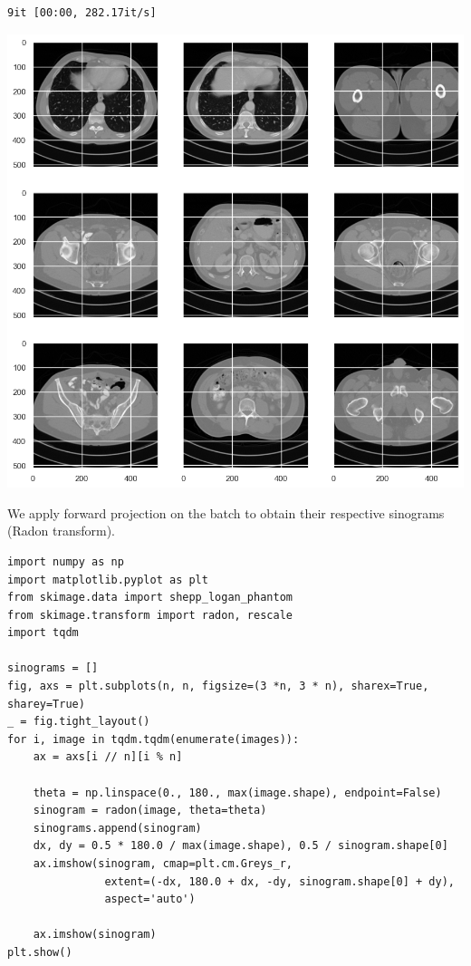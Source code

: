 \documentclass[a4paper, 11pt]{article}
\begin{document}
\begin{verbatim}
9it [00:00, 282.17it/s]

\end{verbatim}

\begin{center}
\includegraphics[width=.9\linewidth]{./.ob-jupyter/d106bffcb7948cba61b5dba49266665e75137c41.png}
\end{center}


We apply forward projection on the batch to obtain their respective sinograms (Radon transform).
\begin{verbatim}
import numpy as np
import matplotlib.pyplot as plt
from skimage.data import shepp_logan_phantom
from skimage.transform import radon, rescale
import tqdm

sinograms = []
fig, axs = plt.subplots(n, n, figsize=(3 *n, 3 * n), sharex=True, sharey=True)
_ = fig.tight_layout()
for i, image in tqdm.tqdm(enumerate(images)):
    ax = axs[i // n][i % n]

    theta = np.linspace(0., 180., max(image.shape), endpoint=False)
    sinogram = radon(image, theta=theta)
    sinograms.append(sinogram)
    dx, dy = 0.5 * 180.0 / max(image.shape), 0.5 / sinogram.shape[0]
    ax.imshow(sinogram, cmap=plt.cm.Greys_r,
               extent=(-dx, 180.0 + dx, -dy, sinogram.shape[0] + dy),
               aspect='auto')

    ax.imshow(sinogram)
plt.show()
\end{verbatim}
\end{document}
